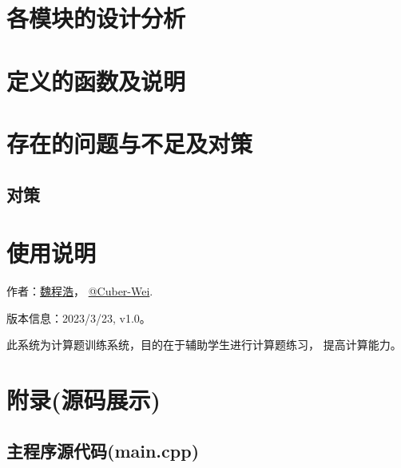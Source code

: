 \documentclass[a4paper]{article}
\begin{document}
\sectionbreak
\section{各模块的设计分析}
\sectionbreak
\section{定义的函数及说明}

\sectionbreak
\section{存在的问题与不足及对策}
\subsection*{对策}

\sectionbreak
\section{使用说明}
\begin{description}
    \seccontent
    \item[程序信息]
        作者：\href{https://www.cnblogs.com/Lovechan/}{魏程浩}，
        \href{https://github.com/Cuber-Wei}{@Cuber-Wei}.

        版本信息：2023/3/23, v1.0。

    \item[系统简介]
        此系统为计算题训练系统，目的在于辅助学生进行计算题练习，
        提高计算能力。

\end{description}

\sectionbreak


\sectionbreak
\clearpage
\appendix
{}
{}
\section*{附录(源码展示)}
\renewcommand{\thesubsection}{\thesection\Alph{subsection}}
\subsection{主程序源代码(main.cpp)}
\end{document}
